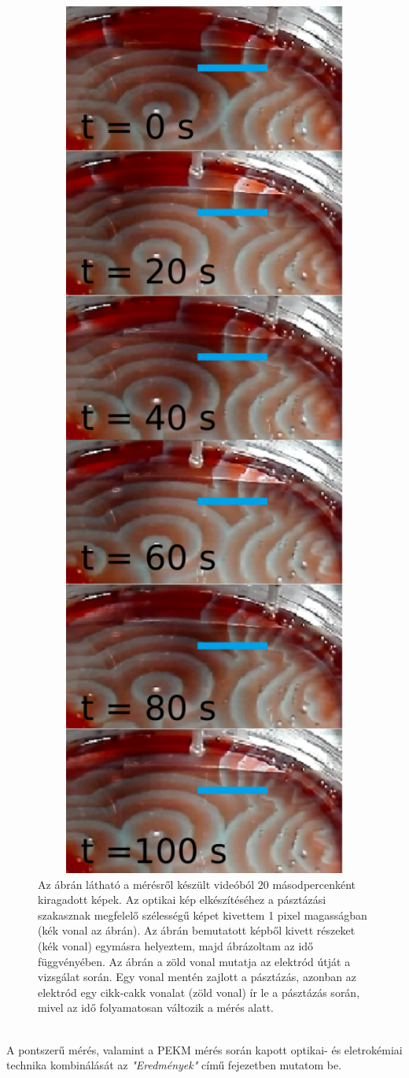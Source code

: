\begin{figure}[!h]
\centering
\includegraphics[width=1\textwidth]{img/pasztazas.png}
\caption{Az ábrán látható a mérésről készült videóból 20 másodpercenként kiragadott képek. Az optikai kép elkészítéséhez a pásztázási szakasznak megfelelő szélességű képet kivettem 1 pixel magasságban (kék vonal az ábrán). Az ábrán bemutatott képből kivett részeket (kék vonal) egymásra helyeztem, majd ábrázoltam az idő függvényében. Az ábrán a zöld vonal mutatja az elektród útját a vizsgálat során. Egy vonal mentén zajlott a pásztázás, azonban az elektród egy cikk-cakk vonalat (zöld vonal) ír le a pásztázás során, mivel az idő folyamatosan változik a mérés alatt.}
\label{fig:pasztazas}
\end{figure}
\\A pontszerű mérés, valamint a PEKM mérés során kapott optikai- és eletrokémiai technika kombinálását az \emph{"Eredmények"} című fejezetben mutatom be.
